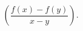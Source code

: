 \documentclass{article}
\begin{document}
\[
    \left(\frac{f(x) - f(y)}{x-y}\right)
.\]
\end{document}
